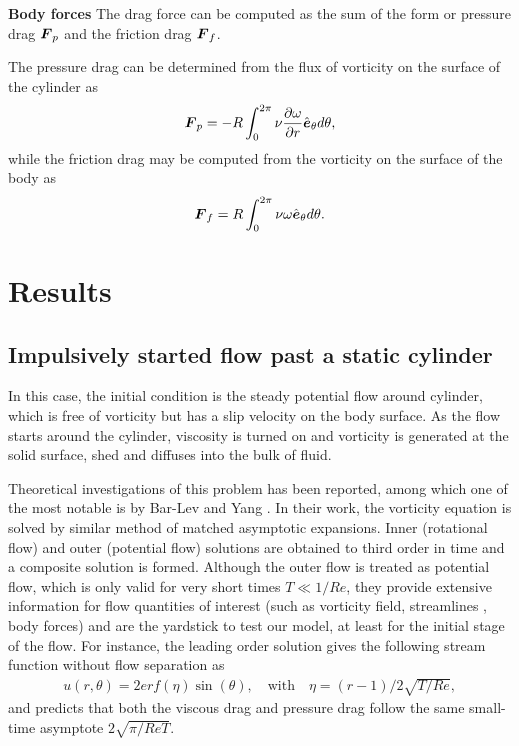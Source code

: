 {\bf Body forces}
The drag force can be computed as the sum of the form or pressure drag $\boldsymbol{F}_p$ and the friction drag $\boldsymbol{F}_f$.

The pressure drag can be determined from the flux of vorticity on the surface of the cylinder as
\begin{align}
\boldsymbol{F}_p = -R \int_0^{2\pi} \nu \frac{\partial \omega}{\partial r} \hat{\boldsymbol{e}}_{\theta} d\theta,
\end{align}
while the friction drag may be computed from the vorticity on the surface of the body as
\begin{align}
\boldsymbol{F}_f = R \int_0^{2\pi} \nu \omega \hat{\boldsymbol{e}}_{\theta} d\theta.
\end{align}


\section{Results}

\subsection{Impulsively started flow past a static cylinder}

In this case, the initial condition is the steady potential flow around cylinder, which is free of vorticity but has a slip velocity on the body surface.
As the flow starts around the cylinder, viscosity is turned on and vorticity is generated at the solid surface, shed and diffuses into the bulk of fluid.

Theoretical investigations of this problem has been reported, among which one of the most notable is by Bar-Lev and Yang \cite{bar1975initial}.
In their work, the vorticity equation is solved by similar method of matched asymptotic expansions.
Inner (rotational flow) and outer (potential flow) solutions are obtained to third order in time and a composite solution is formed.
Although the outer flow is treated as potential flow, which is only valid for very short times $T \ll 1/Re$, they provide extensive information for flow quantities of interest (such as vorticity field, streamlines , body forces) and are the yardstick to test our model, at least for the initial stage of the flow.
For instance, the leading order solution gives the following stream function without flow separation as 
\begin{align} \label{eqn:BarLevYang}
u(r, \theta) = 2 erf(\eta) \sin(\theta),  \text{~~~with~~~}  \eta = (r-1)/2\sqrt{T/Re},
\end{align}
and predicts that both the viscous drag and pressure drag follow the same small-time asymptote $2\sqrt{\pi/ReT}$.

